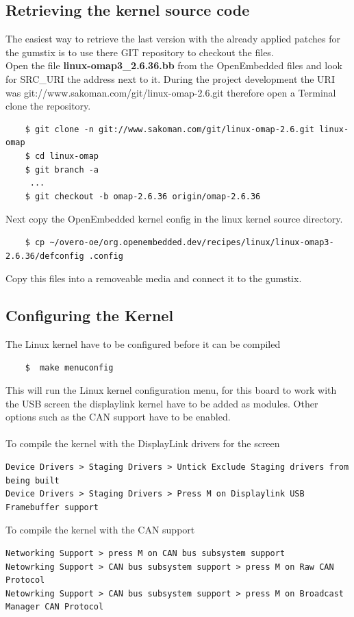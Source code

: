 \documentclass[11pt]{report} %
\begin{document}
		\subsection{Retrieving the kernel source code}
		The easiest way to retrieve the last version with the already applied
		patches for the gumstix is to use there GIT repository to checkout the
		files.\\
		Open the file {\bf linux-omap3\_2.6.36.bb} from the OpenEmbedded files
		and look for SRC\_URI the address next to it. During the project
		development the URI was git://www.sakoman.com/git/linux-omap-2.6.git
		therefore open a Terminal clone the repository.
\begin{lstlisting}
	$ git clone -n git://www.sakoman.com/git/linux-omap-2.6.git linux-omap
	$ cd linux-omap
	$ git branch -a
	 ...
	$ git checkout -b omap-2.6.36 origin/omap-2.6.36
\end{lstlisting}
		Next copy the OpenEmbedded kernel config in the linux kernel source 
		directory.
\begin{lstlisting}
	$ cp ~/overo-oe/org.openembedded.dev/recipes/linux/linux-omap3-2.6.36/defconfig .config
\end{lstlisting}
		Copy this files into a removeable media and connect it to the gumstix.

		\subsection{Configuring the Kernel}
		The Linux kernel have to be configured before it can be compiled
\begin{lstlisting}
	$  make menuconfig
\end{lstlisting}
		This will run the Linux kernel configuration menu, for this board to
		work with the USB screen the displaylink kernel have to be added as
		modules. Other options such as the CAN support have to be enabled.\\
		\\
		To compile the kernel with the DisplayLink drivers for the screen
\begin{lstlisting}
Device Drivers > Staging Drivers > Untick Exclude Staging drivers from being built
Device Drivers > Staging Drivers > Press M on Displaylink USB Framebuffer support
\end{lstlisting}

		To compile the kernel with the CAN support
\begin{lstlisting}
Networking Support > press M on CAN bus subsystem support
Netowrking Support > CAN bus subsystem support > press M on Raw CAN Protocol
Netowrking Support > CAN bus subsystem support > press M on Broadcast Manager CAN Protocol
\end{lstlisting}
\end{document}

